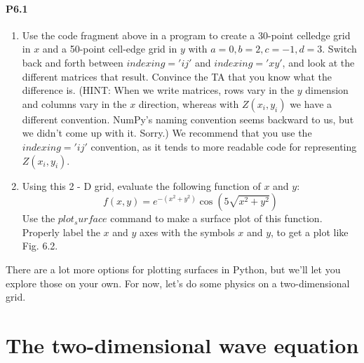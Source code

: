 \documentclass{book}
\theoremstyle{plain}
\theoremstyle{definition}
\numberwithin{exm}{chapter}
\theoremstyle{remark}
\theoremstyle{summary}
\theoremstyle{overview}
\begin{document}
\paragraph*{P6.1} 

\begin{enumerate}[label=(\alph*)]
\item
Use the code fragment above in a program to create a 30-point celledge grid in $x$ and a 50-point cell-edge grid in $y$ with $a = 0, b = 2,
c = −1, d = 3$. Switch back and forth between $indexing='ij'$ and
$indexing='xy'$, and look at the different matrices that result. Convince the TA that you know what the difference is. (HINT: When
we write matrices, rows vary in the $y$ dimension and columns vary
in the $x$ direction, whereas with $Z(x_i, y_i)$ we have a different convention. NumPy\rq s naming convention seems backward to us, but
we didn\rq t come up with it. Sorry.) We recommend that you use the
$indexing='ij'$ convention, as it tends to more readable code for representing $Z(x_i, y_i)$.
\item  Using this 2 - D grid, evaluate the following function of $x$ and $y$:
\begin{equation}\label{eq:61}
f(x,y) = e^{-(x^2+y^2)} \cos(5\sqrt{x^2+y^2})
\end{equation}
Use the $plot_surface$ command to make a surface plot of this function. Properly label the $x$ and $y$ axes with the symbols $x$ and $y$, to get
a plot like Fig. 6.2.
\end{enumerate}
There are a lot more options for plotting surfaces in Python, but we\rq ll let you
explore those on your own. For now, let\rq s do some physics on a two-dimensional
grid.
\section*{The two-dimensional wave equation}
\end{document}
